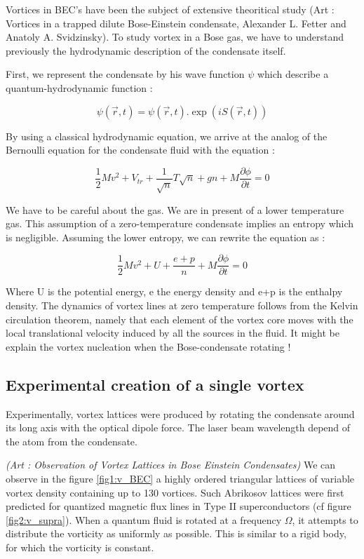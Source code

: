 \documentclass[a4paper]{article}
\begin{document}
\begin{multicols}{2}
Vortices in BEC’s have been the subject of extensive theoritical study (Art : Vortices in a trapped dilute Bose-Einstein condensate, Alexander L. Fetter and Anatoly A. Svidzinsky). 
To study vortex in a Bose gas, we have to understand previously the hydrodynamic description of the condensate itself.

First, we represent the condensate by his wave function $\psi$ which describe a quantum-hydrodynamic function :

\[\psi(\vec{r}, t) = \psi(\vec{r}, t).\exp(i S(\vec{r}, t))\]

By using a classical hydrodynamic equation, we arrive at the analog of the Bernoulli equation for the condensate fluid with the equation :

\[\frac{1}{2}Mv^2 + V_{tr} + \frac{1}{\sqrt{n}}T\sqrt{n} + gn + M\frac{\partial\phi}{\partial t} = 0\]

We have to be careful about the gas. We are in present of a lower temperature gas. This assumption of a zero-temperature condensate implies an entropy which is negligible.
Assuming the lower entropy, we can rewrite the equation as :

\[\frac{1}{2}Mv^2 + U + \frac{e+p}{n} + M\frac{\partial \phi}{\partial t} = 0\]

Where U is the potential energy, e the energy density and e+p is the enthalpy density.
The dynamics of vortex lines at zero temperature follows from the Kelvin circulation theorem, namely that each element of the vortex core moves with the local translational velocity induced by all the sources in the fluid. It might be explain the vortex nucleation when the Bose-condensate rotating !

\subsection*{Experimental creation of a single vortex}

Experimentally, vortex lattices were produced by rotating the condensate around its long axis with the optical dipole force. The laser beam wavelength depend of the atom from the condensate. 

\textit{(Art : Observation of Vortex Lattices in Bose Einstein Condensates)}
We can observe in the figure \ref{fig1:v_BEC} a highly ordered triangular lattices of variable vortex density containing up to 130 vortices. Such Abrikosov lattices were first predicted for quantized magnetic flux lines in Type II superconductors (cf figure \ref{fig2:v_supra}). 
When a quantum fluid is rotated at a frequency $\Omega$, it attempts to distribute the vorticity as uniformly as possible. This is similar to a rigid body, for which the vorticity is constant.



\end{multicols}
\end{document}
